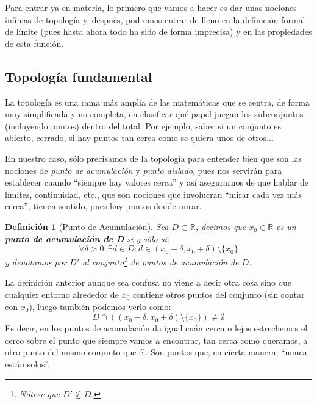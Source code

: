 \documentclass[10pt,a4paper,openright]{book}
\theoremstyle{break}
\newtheorem{defi}{Definición}[chapter]
\begin{document}
Para entrar ya en materia, lo primero que vamos a hacer es dar unas nociones ínfimas de topología y, después, podremos entrar de lleno en la definición formal de límite (pues hasta ahora todo ha sido de forma imprecisa) y en las propiedades de esta función.

\subsection{Topología fundamental}
La topología es una rama más amplia de las matemáticas que se centra, de forma muy simplificada y no completa, en clasificar qué papel juegan los subconjuntos (incluyendo puntos) dentro del total. Por ejemplo, saber si un conjunto es abierto, cerrado, si hay puntos tan cerca como se quiera unos de otros...

En nuestro caso, sólo precisamos de la topología para entender bien qué son las nociones de \textit{punto de acumulación} y \textit{punto aislado}, pues nos servirán para establecer cuando ``siempre hay valores cerca'' y así asegurarnos de que hablar de límites, continuidad, etc., que son nociones que involucran ``mirar cada vez más cerca'', tienen sentido, pues hay puntos donde mirar.

\begin{defi}[Punto de Acumulación]
Sea $D\subset \mathbb R$, decimos que $x_0\in \mathbb R$ es un \textbf{punto de acumulación de D} si y sólo si:
$$\forall \delta>0: \exists d\in D: d\in (x_0-\delta, x_0+\delta)\setminus\{x_0\}$$
y denotamos por $D'$ al conjunto\footnote{Nótese que $D'\nsubseteq D$.} de puntos de acumulación de $D$.
\end{defi}

La definición anterior aunque sea confusa no viene a decir otra cosa sino que cualquier entorno alrededor de $x_0$ contiene otros puntos del conjunto (sin contar con $x_0$), luego también podemos verlo como:
\[
D\cap \left((x_0-\delta, x_0+\delta)\setminus \{x_0\}\right)\neq \emptyset
\]
Es decir, en los puntos de acumulación da igual cuán cerca o lejos estrechemos el cerco sobre el punto que siempre vamos a encontrar, tan cerca como queramos, a otro punto del mismo conjunto que él. Son puntos que, en cierta manera, ``nunca están solos''.
\end{document}
